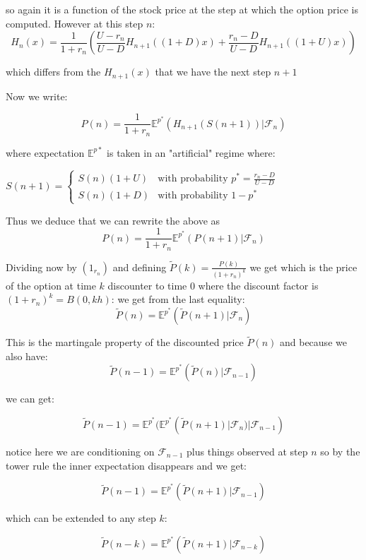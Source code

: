 \documentclass[oneside]{book}
\begin{document}
so again it is a function of the stock price at the step at which the option price is
computed. However at this step $n$:
\begin{equation*}
    H_n(x) = \frac{1}{1+r_n} \left(\frac{U-r_n}{U-D}H_{n+1}((1+D)x) + \frac{r_n - D}{U-D}H_{n+1}
    ((1+U)x)\right)
\end{equation*}

which differs from the $H_{n+1}(x)$ that we have the next step $n+1$

Now we write:

$$
P(n) = \frac{1}{1+r_n}\mathbb{E}^{p^*}(H_{n+1}(S(n+1)) |\mathcal{F}_n)
$$

where expectation $\mathbb{E}^{p*}$ is taken in an "artificial" regime where:


$S(n+1)=\begin{cases}
S(n)(1+U) & \text{with probability } p^* = \frac{r_n-D}{U-D} \\
S(n)(1+D)  & \text{with probability } 1-p^*
\end{cases}$


Thus we deduce that we can rewrite the above as
$$
P(n) = \frac{1}{1+r_n}\mathbb{E}^{p^*}(P(n+1)|\mathcal{F}_n)
$$

Dividing now by $(1_{r_n})$ and defining $\tilde{P}(k) = \frac{P(k)}{(1+r_n)^k}$ we get
which is the price of the option at time $k$ discounter to time $0$ where the discount
factor is $(1+r_n)^k = B(0, kh)$:
we get from the last equality:
\begin{equation*}
    \tilde{P}(n) = \mathbb{E}^{p^*}(\tilde{P}(n+1)|\mathcal{F}_n)
\end{equation*}

{\color{red} This is the martingale property of the discounted price $\tilde{P}(n)$}
and because we also have:
$$
\tilde{P}(n-1) = \mathbb{E}^{p^*}(\tilde{P}(n)|\mathcal{F}_{n-1})
$$

we can get:

$$
    \tilde{P}(n-1) = \mathbb{E}^{p^*}( \mathbb{E}^{p^*}(\tilde{P}(n+1)|\mathcal{F}_n)
 | \mathcal{F}_{n-1})
$$

notice here we are conditioning on $\mathcal{F}_{n-1}$ plus things observed at step $n$
so by the tower rule the inner expectation disappears and we get:

$$
    \tilde{P}(n-1) = \mathbb{E}^{p^*}(\tilde{P}(n+1)|\mathcal{F}_{n-1})
$$

which can be extended to any step $k$:

$$
    \tilde{P}(n-k) = \mathbb{E}^{p^*}(\tilde{P}(n+1)|\mathcal{F}_{n-k})
$$
\end{document}
